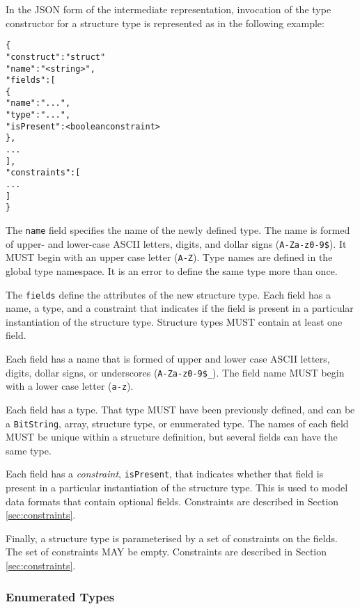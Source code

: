 \documentclass[10pt,twocolumn,a4paper]{article}
\newcommand{\code}[1]{\texttt{#1}}
\begin{document}
In the JSON form of the intermediate representation, invocation of the type
constructor for a structure type is represented as in the following example:
\footnotesize
\begin{alltt}
  \{
    "construct"   : "struct"
    "name"        : "<string>",
    "fields"      : [
      \{
        "name"      : "...",
        "type"      : "...",
        "isPresent" : <boolean constraint>
      \},
      ...
    ],
    "constraints" : [
      ...
    ]
  \}
\end{alltt}
\normalsize
The \code{name} field specifies the name of the newly defined type. The
name is formed of upper- and lower-case ASCII letters, digits, and dollar
signs (\code{A-Za-z0-9\$}).  It MUST begin with an upper case letter
(\code{A-Z}). Type names are defined in the global type namespace.
It is an error to define the same type more than once.

The \code{fields} define the attributes of the new structure type. Each
field has a name, a type, and a constraint that indicates if the field is
present in a particular instantiation of the structure type. Structure
types MUST contain at least one field.

Each field has a name that is formed of upper and lower case ASCII letters,
digits, dollar signs, or underscores (\code{A-Za-z0-9\$\_}). The field name
MUST begin with a lower case letter (\code{a-z}).

Each field has a type. That type MUST have been previously defined, and can
be a \code{BitString}, array, structure type, or enumerated type. The names
of each field MUST be unique within a structure definition, but several
fields can have the same type.

Each field has a \emph{constraint}, \code{isPresent}, that indicates
whether that field is present in a particular instantiation of the
structure type. This is used to model data formats that contain optional
fields. Constraints are described in Section \ref{sec:constraints}.

Finally, a structure type is parameterised by a set of constraints on the
fields. The set of constraints MAY be empty. Constraints are described in
Section \ref{sec:constraints}.


\subsubsection{Enumerated Types}
\end{document}

